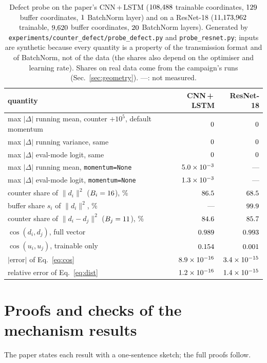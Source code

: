 \documentclass[journal]{IEEEtran}
\begin{document}
\begin{table}[t]
\centering
\caption{Defect probe on the paper's CNN\,+\,LSTM ($108{,}488$ trainable
coordinates, $129$ buffer coordinates, $1$ BatchNorm layer) and on a
ResNet-18 ($11{,}173{,}962$ trainable, $9{,}620$ buffer coordinates, $20$ BatchNorm
layers). Generated by \texttt{experiments/counter\_defect/probe\_defect.py} and
\texttt{probe\_resnet.py}; inputs are synthetic because every quantity is a
property of the transmission format and of BatchNorm, not of the data (the shares
also depend on the optimiser and learning rate). Shares on real data come from the
campaign's runs (Sec.~\ref{sec:geometry}). ---: not measured.}
\label{tab:probe}
\footnotesize
\setlength{\tabcolsep}{3pt}
\begin{tabular}{@{}p{}rr@{}}
\toprule
quantity & CNN\,+\,LSTM & ResNet-18 \\
\midrule
max $|\Delta|$ running mean, counter $+10^5$, default momentum & $0$ & $0$ \\
max $|\Delta|$ running variance, same & $0$ & $0$ \\
max $|\Delta|$ eval-mode logit, same & $0$ & $0$ \\
max $|\Delta|$ running mean, \texttt{momentum=None} & $5.0\times10^{-3}$ & --- \\
max $|\Delta|$ eval-mode logit, \texttt{momentum=None} & $1.3\times10^{-3}$ & --- \\
\midrule
counter share of $\|d_i\|^2$ ($B_i=16$), \% & $86.5$ & $68.5$ \\
buffer share $s_i$ of $\|d_i\|^2$, \% & --- & $99.9$ \\
counter share of $\|d_i-d_j\|^2$ ($B_j=11$), \% & $84.6$ & $85.7$ \\
$\cos(d_i,d_j)$, full vector & $0.989$ & $0.993$ \\
$\cos(u_i,u_j)$, trainable only & $0.154$ & $0.001$ \\
$|$error$|$ of Eq.~\eqref{eq:cos} & $8.9\times10^{-16}$ & $3.4\times10^{-15}$ \\
relative error of Eq.~\eqref{eq:dist} & $1.2\times10^{-16}$ & $1.4\times10^{-15}$ \\
\bottomrule
\end{tabular}
\end{table}

\section{Proofs and checks of the mechanism results}
\label{sup:proofs}
The paper states each result with a one-sentence sketch; the full proofs follow.
\end{document}
